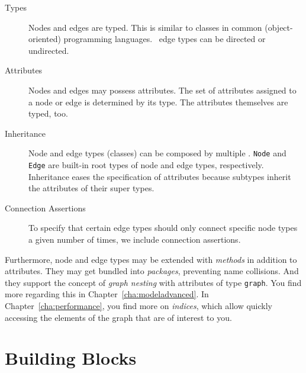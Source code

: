 \begin{description}
\item[Types] Nodes and edges are typed.
  This is similar to classes in common (object-oriented) programming languages. \GrG\ edge types can be directed or undirected.
\item[Attributes] Nodes and edges may possess attributes. The set of attributes assigned to a node or edge is determined by its type. The attributes themselves are typed, too.
\item[Inheritance] Node and edge types (classes) can be composed by multiple . \texttt{Node} and \texttt{Edge} are built-in root types of node and edge types, respectively. Inheritance eases the specification of attributes because subtypes inherit the attributes of their super types. 
\item[Connection Assertions] To specify that certain edge types should only connect specific node types a given number of times, we include connection assertions.
\end{description}

Furthermore, node and edge types may be extended with \emph{methods} in addition to attributes.
They may get bundled into \emph{packages}, preventing name collisions.
And they support the concept of \emph{graph nesting} with attributes of type \texttt{graph}.
You find more regarding this in Chapter~\ref{cha:modeladvanced}.
In Chapter~\ref{cha:performance}, you find more on \emph{indices}, which allow quickly accessing the elements of the graph that are of interest to you.

\section{Building Blocks}
\label{modelbb}

